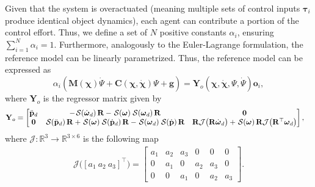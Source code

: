 Given that the system is overactuated (meaning multiple sets of control inputs $\boldsymbol{\tau}_i$ produce identical object dynamics), each agent can contribute a portion of the control effort. Thus, we define a set of $N$ positive constants $\alpha_i$, ensuring $\sum_{i=1}^N\alpha_i=1$. Furthermore, analogously to the Euler-Lagrange formulation, the reference model can be linearly parametrized. Thus, the reference model can be expressed as 
\begin{equation}
    \alpha _i \left(\mathbf {M}(\boldsymbol{\chi})\dot{\Psi} + \mathbf {C}(\boldsymbol{\chi},\dot{\boldsymbol{\chi}})\Psi + \mathbf {g} \right) = \mathbf{Y}_o(\boldsymbol{\chi}, \dot{\boldsymbol{\chi}}, \Psi, \dot{\Psi})\mathbf{o}_i, \label{eq:ref-model-linear-parametrization}
\end{equation}
where $\mathbf{Y}_o$ is the regressor matrix given by
\begin{align}
    \mathbf{Y}_o &= \begin{bmatrix}
        \ddot{\mathbf{p}}_d & -\SL[\dot{\boldsymbol{\omega}}_d]\mathbf{R}-\SL[\boldsymbol{\omega}]\SL[\boldsymbol{\omega}_d]\mathbf{R} & \mathbf{0}\\
        \mathbf{0} & \SL[\ddot{\mathbf{p}}_d]\mathbf{R} + \SL[\boldsymbol{\omega}]\SL[\dot{\mathbf{p}}_d]\mathbf{R} - \SL[\boldsymbol{\omega}_d]\SL[\dot{\mathbf{p}}]\mathbf{R} & \mathbf{R}\mathcal{J}\bigl(\mathbf{R}\dot{\boldsymbol{\omega}}_d\bigr) + \SL[\boldsymbol{\omega}]\mathbf{R}\mathcal{J}\bigl(\mathbf{R}^\top\boldsymbol{\omega}_d\bigr)
    \end{bmatrix},
\end{align}
where $\mathcal{J}:\mathbb{R}^3\to\mathbb{R}^{3\times6}$ is the following map
\begin{align}
    \mathcal{J}\bigl([a_1\ a_2\ a_3]^\top\bigr)=\begin{bmatrix}
        a_1 & a_2 & a_3 & 0 & 0 & 0 \\
        0 & a_1 & 0 & a_2 & a_3 & 0 \\
        0 & 0 & a_1 & 0 & a_2 & a_3
    \end{bmatrix}.
\end{align}
